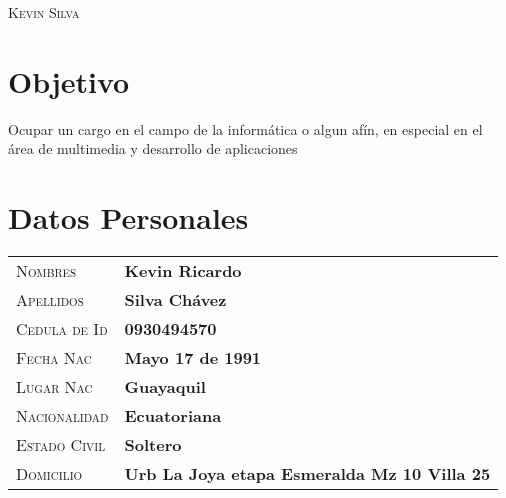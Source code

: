 \documentclass[a4paper, oneside, final]{scrartcl} %
\newcommand{\gray}{\rowcolor[gray]{.90}} %
\begin{document}
\begin{center} %


{\fontsize{36}{36}\selectfont\scshape Kevin  Silva} %

\vspace{1.5cm} %


\section{Objetivo}

Ocupar un cargo en el campo de la informática o algun afín, en especial en el área de multimedia y desarrollo de aplicaciones


\section{Datos Personales}

\begin{tabularx}{0.97\linewidth}{>{\raggedleft\scshape}p{}X}
\gray Nombres & \textbf{Kevin Ricardo}\\
\gray Apellidos & \textbf{Silva Chávez} \\
\gray Cedula de Id & \textbf{0930494570}\\
\gray Fecha Nac & \textbf{Mayo 17 de 1991}\\
\gray Lugar Nac & \textbf{Guayaquil}\\
\gray Nacionalidad & \textbf{Ecuatoriana}\\
\gray Estado Civil & \textbf{Soltero}\\
\gray Domicilio & \textbf{Urb La Joya etapa Esmeralda Mz 10 Villa 25}\\

\end{tabularx}
\vspace{12pt}


\end{center}
\end{document}
